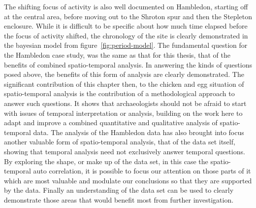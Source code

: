 The shifting focus of activity is also well documented on Hambledon, starting off at the central area, before moving out to the Shroton spur and then the Stepleton enclosure. While it is difficult to be specific about how much time elapsed before the focus of activity shifted, the chronology of the site is clearly demonstrated in the bayesian model from figure~\ref{fig:period-model}. The fundamental question for the Hambledon case study, was the same as that for this thesis, that of the benefits of combined spatio-temporal analysis. In answering the kinds of questions posed above, the benefits of this form of analysis are clearly demonstrated.  The significant contribution of this chapter then, to the chicken and egg situation of spatio-temporal analysis \citep{Bailey:2007fk} is the contribution of a methodological approach to answer such questions. It shows that archaeologists should not be afraid to start with issues of temporal interpretation or analysis, building on the work here to adapt and improve a combined quantitative and qualitative analysis of spatio-temporal data. The analysis of the Hambledon data has also brought into focus another valuable form of spatio-temporal analysis, that of the data set itself, showing that temporal analysis need not exclusively answer temporal questions. By exploring the shape, or make up of the data set, in this case the spatio-temporal auto correlation, it is possible to focus our attention on those parts of it which are most valuable and modulate our conclusions so that they are supported by the data. Finally an understanding of the data set can be used to clearly demonstrate those areas that would benefit most from further investigation.

